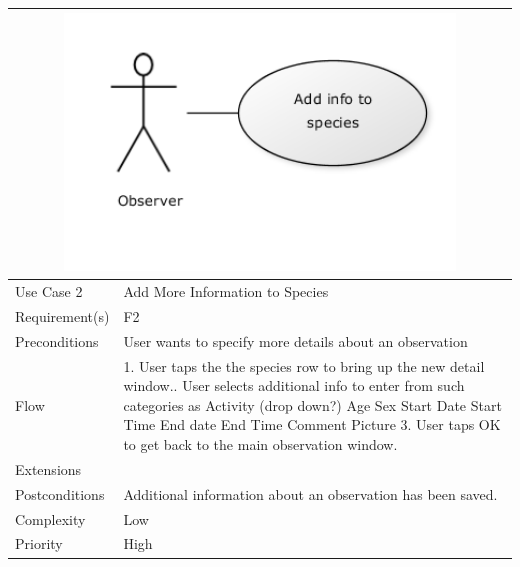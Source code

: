 \begin{tabular}[t]{|l|p{}|}
	\multicolumn{2}{c}{\includegraphics[width=0.8\textwidth]{reqspec/uc/addinfo.png}}\\\hline
	Use Case 2&Add More Information to Species\\\hline
	Requirement(s)&F2\\\hline
	Preconditions&User wants to specify more details about an observation\\\hline
	Flow& 1. User taps the the species row to bring up the new detail window.\newline
	2. User selects additional info to enter from such categories as \newline
	Activity (drop down?) \newline
	Age\newline
	Sex\newline
	Start Date\newline
	Start Time\newline
	End date \newline
	End Time \newline
	Comment \newline
	Picture \newline
	3. User taps OK to get back to the main observation window.\\\hline
	Extensions& \\\hline
	Postconditions& Additional information about an observation has been saved.\\\hline
	Complexity&Low\\\hline
	Priority&High\\\hline
\end{tabular}

